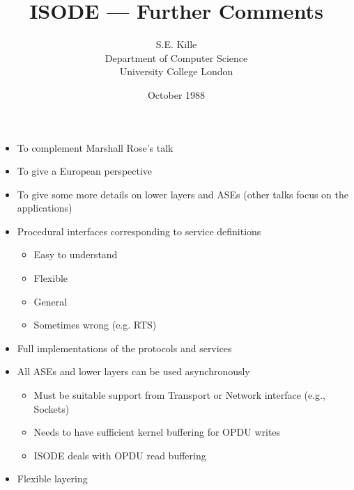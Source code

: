 
\author {S.E. Kille \\
Department of Computer Science \\
University College London}

\date {October 1988}
\raggedright
\title {ISODE --- Further Comments}



\maketitlepage

\begin {bwslide}
\begin {itemize}
\item To complement Marshall Rose's talk
\item To give a European perspective
\item To give some more details on lower layers and ASEs (other talks focus
on the applications)
\end {itemize}
\end {bwslide}

\begin {bwslide}
\begin {itemize}
\item Procedural interfaces corresponding to service definitions
\begin {itemize}
\item Easy to understand
\item Flexible
\item General
\item Sometimes wrong (e.g. RTS)
\end {itemize}

\item Full implementations of the protocols and services

\item All ASEs and lower layers can be used asynchronously
\begin {itemize}
\item Must be suitable support from Transport or Network interface (e.g.,
Sockets)
\item Needs to have sufficient kernel buffering for OPDU writes
\item ISODE deals with OPDU read buffering
\end {itemize}

\item Flexible layering 
\end {itemize}
\end {bwslide}



